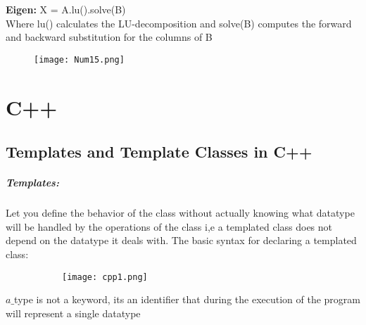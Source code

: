 \documentclass[8pt]{extreport}
\begin{document}
\textbf{Eigen:} X = A.lu().solve(B)\\
Where lu() calculates the LU-decomposition and solve(B) computes the forward and backward substitution for the columns of B
\begin{figure}[H]
\centering
\texttt{[image: Num15.png]}
\end{figure}
































































\chapter{C++}

\section{Templates and Template Classes in C++} 

\paragraph{Templates:} Let you define the behavior of the class without actually knowing what datatype will be handled by the operations of the class i,e a templated class does not depend on the datatype it deals with. The basic syntax for declaring a templated class:
\begin{figure}[H]
\centering
\begin{subfigure}[b]{0.4\linewidth}
\texttt{[image: cpp1.png]}
\end{subfigure}
\end{figure}
$a\_$type is not a keyword, its an identifier that during the execution of the program will represent a single datatype\\
\end{document}
